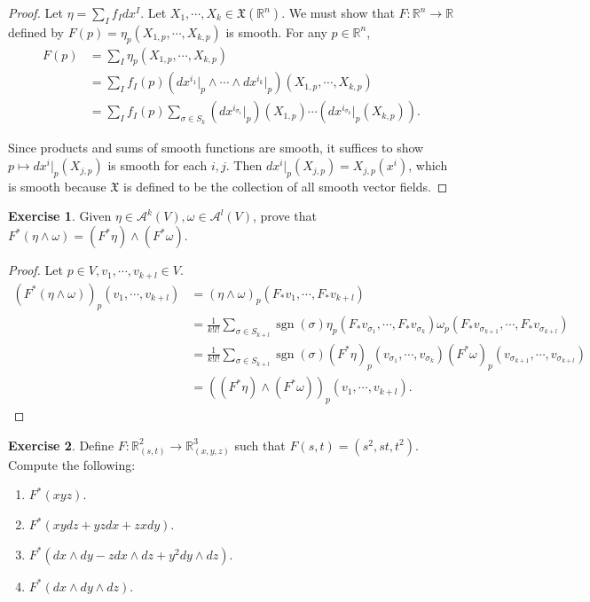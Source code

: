 \documentclass[12pt, psamsfonts]{amsart}
\theoremstyle{definition}
\newtheorem*{exer}{Exercise}
\theoremstyle{remark}
\DeclareMathOperator{\sgn}{sgn}
\numberwithin{equation}{section}
\begin{document}
\begin{proof}
  Let $\eta = \sum_{I} f_Idx^I$.
  Let $X_1, \cdots, X_k \in \mathfrak{X}(\mathbb{R}^n)$.
  We must show that $F: \mathbb{R}^n \rightarrow \mathbb{R}$ defined by $F(p) = \eta_p(X_{1, p}, \cdots, X_{k, p})$ is smooth.
  For any $p \in \mathbb{R}^n$,
  \begin{align*}
    F(p)
      &= \sum_{I} \eta_p(X_{1, p}, \cdots, X_{k, p}) \\
      &= \sum_{I} f_I(p)(dx^{i_1}\vert_p \wedge \cdots \wedge dx^{i_k}\vert_p)(X_{1, p}, \cdots, X_{k, p}) \\
      &= \sum_{I} f_I(p) \sum_{\sigma \in S_k} (dx^{i_{\sigma_1}}\vert_p)(X_{1, p}) \cdots (dx^{i_{\sigma_k}}\vert_p(X_{k, p})).
  \end{align*}

  Since products and sums of smooth functions are smooth, it suffices to show $p \mapsto dx^{i}\vert_p(X_{j, p})$ is smooth for each $i, j$.
  Then $dx^i\vert_p(X_{j, p}) = X_{j, p}(x^i)$, which is smooth because $\mathfrak{X}$ is defined to be the collection of all smooth vector fields.
\end{proof}

\begin{exer}
  Given $\eta \in \mathscr{A}^k(V), \omega \in \mathscr{A}^l(V)$, prove that $F^*(\eta \wedge \omega) = (F^*\eta) \wedge (F^*\omega)$.
\end{exer}

\begin{proof}
  Let $p \in V, v_1, \cdots, v_{k + l} \in V$.
  \begin{align*}
    (F^*(\eta \wedge \omega))_p(v_1, \cdots, v_{k + l})
      &= (\eta \wedge \omega)_p(F_*v_1, \cdots, F_*v_{k + l}) \\
      &= \frac{1}{k!l!}\sum_{\sigma \in S_{k + l}} \sgn(\sigma) \eta_p(F_*v_{\sigma_1}, \cdots, F_*v_{\sigma_k})\omega_p(F_*v_{\sigma_{k + 1}}, \cdots, F_*v_{\sigma_{k + l}}) \\
      &= \frac{1}{k!l!}\sum_{\sigma \in S_{k + l}} \sgn(\sigma) (F^*\eta)_p(v_{\sigma_1}, \cdots, v_{\sigma_k})(F^*\omega)_p(v_{\sigma_{k + 1}}, \cdots, v_{\sigma_{k + l}}) \\
      &= ((F^*\eta) \wedge (F^*\omega))_p(v_1, \cdots, v_{k + l}).
  \end{align*}
\end{proof}

\begin{exer}
  Define $F: \mathbb{R}^2_{(s, t)} \rightarrow \mathbb{R}^3_{(x, y, z)}$ such that $F(s, t) = (s^2, st, t^2)$.
  Compute the following:
  \begin{enumerate}
    \item
      $F^*(xyz)$.
    \item
      $F^*(xydz + yzdx + zxdy)$.
    \item
      $F^*(dx \wedge dy - zdx \wedge dz + y^2dy \wedge dz)$.
    \item
      $F^*(dx \wedge dy \wedge dz)$.
  \end{enumerate}
\end{exer}
\end{document}
